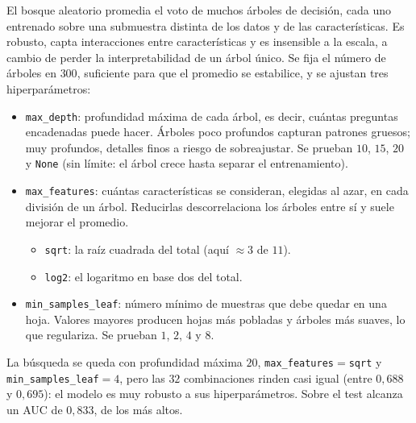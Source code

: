 \documentclass[12pt,a4paper]{report}
\theoremstyle{definition}
\newcommand{\tc}[1]{\texttt{#1}}
\begin{document}
El bosque aleatorio promedia el voto de muchos árboles de decisión, cada uno entrenado sobre
una submuestra distinta de los datos y de las características. Es robusto,
capta interacciones entre características y es insensible a la escala, a cambio de perder la
interpretabilidad de un árbol único. Se fija el número de árboles en $300$, suficiente para
que el promedio se estabilice, y se ajustan tres hiperparámetros:

\begin{itemize}
\item \tc{max\_depth}: profundidad máxima de cada árbol, es decir, cuántas preguntas
encadenadas puede hacer. Árboles poco profundos capturan patrones gruesos; muy profundos,
detalles finos a riesgo de sobreajustar. Se prueban $10$, $15$, $20$ y \tc{None} (sin límite:
el árbol crece hasta separar el entrenamiento).
\item \tc{max\_features}: cuántas características se consideran, elegidas al azar, en cada
división de un árbol. Reducirlas descorrelaciona los árboles entre sí y suele mejorar el
promedio.
  \begin{itemize}
  \item \tc{sqrt}: la raíz cuadrada del total (aquí $\approx 3$ de $11$).
  \item \tc{log2}: el logaritmo en base dos del total.
  \end{itemize}
\item \tc{min\_samples\_leaf}: número mínimo de muestras que debe quedar en una hoja. Valores
mayores producen hojas más pobladas y árboles más suaves, lo que regulariza. Se prueban $1$,
$2$, $4$ y $8$.
\end{itemize}

La búsqueda se queda con profundidad máxima $20$,
\tc{max\_features}${}=$\tc{sqrt} y \tc{min\_samples\_leaf}${}=4$, pero las $32$ combinaciones
rinden casi igual (entre $0{,}688$ y $0{,}695$): el modelo es muy robusto a sus
hiperparámetros. Sobre el test alcanza un AUC de $0{,}833$, de los
más altos.
\end{document}
